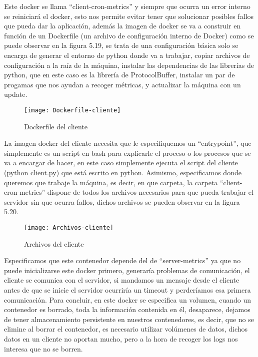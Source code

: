 \documentclass[ spanish, a4paper, 12pt, oneside]{report}
\begin{document}
Este docker se llama ``client-cron-metrics'' y siempre que ocurra un error interno se reiniciará el docker, esto nos permite evitar 
tener que solucionar posibles fallos que pueda dar la aplicación, además la imagen de docker se va a construir en función de un Dockerfile (un archivo de configuración interno de Docker) como se puede observar en la figura 5.19, se trata de una configuración básica 
solo se encarga de generar el entorno de python donde va a trabajar, copiar archivos de configuración a la raíz de la máquina, instalar las dependencias de las librerías de python, que en este caso es la librería de ProtocolBuffer, instalar un par de progamas que nos ayudan a recoger métricas, y actualizar 
la máquina con un update. \\

\begin{figure}[!h]
   \centering
   \texttt{[image: Dockerfile-cliente]}\\
      \caption{\label{fig: Dockerfile del cliente} Dockerfile del cliente}
\end{figure}

La imagen docker del cliente necesita que le especifiquemos un ``entrypoint'', que simplemente es un script en bash para explicarle el proceso o los procesos que se va a encargar de hacer, en este caso simplemente ejecuta el script del cliente (python client.py) que está 
escrito en python. Asimismo, especificamos donde queremos que trabaje la máquina, es decir, en que carpeta, la carpeta ``client-cron-metrics'' dispone de todos los archivos necesarios para que pueda trabajar el servidor sin que ocurra fallos, dichos archivos se pueden observar en la figura 5.20.\\

\begin{figure}[!h]
   \centering
   \texttt{[image: Archivos-cliente]}\\
      \caption{\label{fig: Archivos del cliente} Archivos del cliente}
\end{figure}

Especificamos que este contenedor depende del de ``server-metrics'' ya que no puede inicializarse este docker primero, generaría problemas de comunicación, el cliente se comunica con el servidor, si mandamos un mensaje desde el cliente antes de que se inicie el servidor ocurriría un timeout y perderíamos esa primera comunicación. 
Para concluir, en este docker se especifica un volumen, cuando un contenedor es borrado, toda la información contenida en él, desaparece, dejamos de tener almacenamiento persistente en nuestros contenedores, es decir, que no se elimine al borrar el contenedor, es necesario utilizar volúmenes de datos, 
dichos datos en un cliente no aportan mucho, pero a la hora de recoger los logs nos interesa que no se borren.\\
\end{document}

